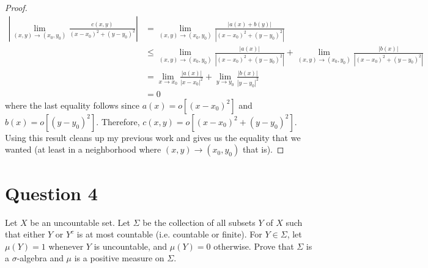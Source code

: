 \documentclass[10pt,a4paper]{article}
\theoremstyle{definition}
\theoremstyle{definition}
\numberwithin{equation}{section}
\begin{document}
\begin{proof}
\begin{align*}
\left|\lim_{(x, y) \to (x_0, y_0)} \frac{c(x, y)}{(x - x_0)^2 + (y - y_0)^2}\right| &= \lim_{(x, y) \to (x_0, y_0)} \frac{|a(x) + b(y)|}{|(x - x_0)^2 + (y - y_0)^2|}\\
&\leq \lim_{(x, y) \to (x_0, y_0)} \frac{|a(x)|}{|(x - x_0)^2 + (y - y_0)^2|} + \lim_{(x, y) \to (x_0, y_0)} \frac{|b(x)|}{|(x - x_0)^2 + (y - y_0)^2|}\\
&= \lim_{x \to x_0} \frac{|a(x)|}{|x - x_0|^2} + \lim_{y \to y_0} \frac{|b(x)|}{|y - y_0|^2}\\
&= 0
\end{align*}
where the last equality follows since $a(x) = o[(x - x_0)^2]$ and $b(x) = o[(y - y_0)^2]$. Therefore, $c(x, y) = o[(x - x_0)^2 + (y - y_0)^2]$. Using this result cleans up my previous work and gives us the equality that we wanted (at least in a neighborhood where $(x, y) \to (x_0, y_0)$ that is). 
\end{proof}

\section*{Question 4}
Let $X$ be an uncountable set. Let $\Sigma$ be the collection of all subsets $Y$ of $X$ such that either $Y$ or $Y^c$ is at most countable (i.e. countable or finite). For $Y \in \Sigma$, let $\mu(Y) = 1$ whenever $Y$ is uncountable, and $\mu(Y) = 0$ otherwise. Prove that $\Sigma$ is a $\sigma$-algebra and $\mu$ is a positive measure on $\Sigma$.
\end{document}
